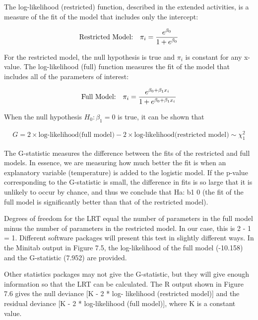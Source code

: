 \documentclass[
]{report}
\begin{document}
The log-likelihood (restricted) function, described in the extended activities, is a measure of the fit of the model that includes only the intercept:

\begin{align}
\text{Restricted Model:} \quad \pi_i = \frac{e^{\beta_0}}{1 + e^{\beta_0}}
\notag
\end{align}

For the restricted model, the null hypothesis is true and \(\pi_i\) is constant for any x-value. The log-likelihood (full) function measures the fit of the model that includes all of the parameters of interest:

\begin{align}
\text{Full Model:} \quad \pi_i = \frac{e^{\beta_0 + \beta_1 x_i}}{1 + e^{\beta_0 + \beta_1 x_i}}
\notag
\end{align}

When the null hypothesis \(H_0: \beta_1 = 0\) is true, it can be shown that

\begin{align}
G = 2 \times \text{log-likelihood(full model)} - 2 \times \text{log-likelihood(restricted model)} \sim \chi^2_1 
\tag{7.15}
\end{align}

The G-statistic measures the difference between the fits of the restricted and full models. In essence, we
are measuring how much better the fit is when an explanatory variable (temperature) is added to the logistic
model. If the p-value corresponding to the G-statistic is small, the difference in fits is so large that it is unlikely
to occur by chance, and thus we conclude that Ha: b1 0 (the fit of the full model is significantly better than
that of the restricted model).

Degrees of freedom for the LRT equal the number of parameters in the full model minus the number of
parameters in the restricted model. In our case, this is 2 - 1 = 1. Different software packages will present
this test in slightly different ways. In the Minitab output in Figure 7.5, the log-likelihood of the full model
(-10.158) and the G-statistic (7.952) are provided.

Other statistics packages may not give the G-statistic, but they will give enough information so that
the LRT can be calculated. The R output shown in Figure 7.6 gives the null deviance {[}K - 2 * log-
likelihood (restricted model){]} and the residual deviance {[}K - 2 * log-likelihood (full model){]}, where
K is a constant value.
\end{document}
